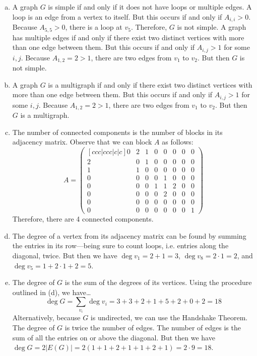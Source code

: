 \documentclass[11pt,letterpaper]{article}
\begin{document}
\sol 
\begin{enumerate}[(a)]
\item A graph $G$ is simple if and only if it does not have loops or multiple edges. A loop is an edge from a vertex to itself. But this occurs if and only if $A_{i,i} > 0$. Because $A_{5,5} > 0$, there is a loop at $v_5$. Therefore, $G$ is not simple. A graph has multiple edges if and only if there exist two distinct vertices with more than one edge between them. But this occurs if and only if $A_{i,j} > 1$ for some $i, j$. Because $A_{1,2}= 2 > 1$, there are two edges from $v_1$ to $v_2$. But then $G$ is not simple. \pspace

\item A graph $G$ is a multigraph if and only if there exist two distinct vertices with more than one edge between them. But this occurs if and only if $A_{i,j} > 1$ for some $i, j$. Because $A_{1,2}= 2 > 1$, there are two edges from $v_1$ to $v_2$. But then $G$ is a multigraph. \pspace

\item The number of connected components is the number of blocks in its adjacency matrix. Observe that we can block $A$ as follows:
	\[
	A= 
	\begin{pmatrix}[ccc|ccc|c|c]
	0 & 2 & 1 & 0 & 0 & 0 & 0 & 0 \\
	2 & 0 & 1 & 0 & 0 & 0 & 0 & 0 \\
	1 & 1 & 0 & 0 & 0 & 0 & 0 & 0 \\ \hline
	0 & 0 & 0 & 0 & 1 & 0 & 0 & 0 \\
	0 & 0 & 0 & 1 & 1 & 2 & 0 & 0 \\
	0 & 0 & 0 & 0 & 2 & 0 & 0 & 0 \\ \hline
	0 & 0 & 0 & 0 & 0 & 0 & 0 & 0 \\ \hline
	0 & 0 & 0 & 0 & 0 & 0 & 0 & 1
	\end{pmatrix}
	\]
Therefore, there are 4 connected components. \pspace

\item The degree of a vertex from its adjacency matrix can be found by summing the entries in its row---being sure to count loops, i.e. entries along the diagonal, twice. But then we have $\deg v_1= 2 + 1= 3$, $\deg v_8= 2 \cdot 1= 2$, and $\deg v_5= 1 + 2 \cdot 1 + 2= 5$. \pspace

\item The degree of $G$ is the sum of the degrees of its vertices. Using the procedure outlined in (d), we have\dots
	\[
	\deg G= \sum_{v_i} \deg v_i= 3 + 3 + 2 + 1 + 5 + 2 + 0 + 2= 18
	\]
Alternatively, because $G$ is undirected, we can use the Handshake Theorem. The degree of $G$ is twice the number of edges. The number of edges is the sum of all the entries on or above the diagonal. But then we have $\deg G= 2 |E(G)|= 2 (1 + 1 + 2 + 1 + 1 + 2 + 1)= 2 \cdot 9= 18$. 
\end{enumerate}
\end{document}
